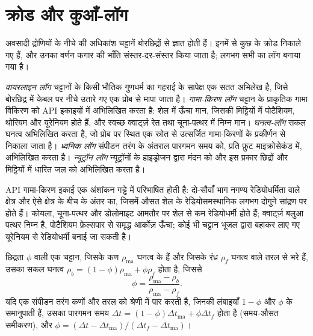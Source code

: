 \section{क्रोड और कुआँ-लॉग}\label{sec:b3:facies-models:logs}

अवसादी द्रोणियों के नीचे की अधिकांश चट्टानें बोरछिद्रों से ज्ञात होती हैं। इनमें से कुछ
के क्रोड निकाले गए हैं, और उनका वर्णन कगार की भाँति संस्तर-दर-संस्तर किया जाता है; लगभग सभी
का लॉग बनाया गया है।

\begin{definition}[वायरलाइन लॉग]\label{def:b3:facies-models:wireline}
\emph{वायरलाइन लॉग} चट्टानों के किसी भौतिक गुणधर्म का गहराई के सापेक्ष एक सतत अभिलेख है,
जिसे बोरछिद्र में केबल पर नीचे उतारे गए एक प्रोब से मापा जाता है।
\emph{गामा-किरण लॉग} चट्टान के प्राकृतिक गामा विकिरण को API इकाइयों में अभिलिखित करता है:
शेल में ऊँचा मान, जिसकी मिट्टियों में पोटैशियम, थोरियम और यूरेनियम होते हैं,
और स्वच्छ क्वार्ट्ज़ रेत तथा चूना-पत्थर में निम्न मान।
\emph{घनत्व-लॉग} सकल घनत्व अभिलिखित करता है, जो प्रोब पर स्थित एक स्रोत से उत्सर्जित
गामा-किरणों के प्रकीर्णन से निकाला जाता है।
\emph{ध्वनिक लॉग} संपीडन तरंग के अंतराल पारगमन समय को,
प्रति फ़ुट माइक्रोसेकंड में, अभिलिखित करता है।
\emph{न्यूट्रॉन लॉग} न्यूट्रॉनों के हाइड्रोजन द्वारा मंदन को
और इस प्रकार छिद्रों और मिट्टियों में धारित जल को अभिलिखित करता है।
\end{definition}

API गामा-किरण इकाई एक अंशांकन गड्ढे में परिभाषित होती है: दो-सौवाँ भाग
नगण्य रेडियोधर्मिता वाले क्षेत्र और ऐसे क्षेत्र के बीच के अंतर का, जिसमें औसत शेल के
रेडियोसमस्थानिक लगभग दोगुने सांद्रण पर होते हैं। कोयला,
चूना-पत्थर और डोलोमाइट आमतौर पर शेल से कम रेडियोधर्मी होते हैं; क्वार्ट्ज़
बलुआ पत्थर निम्न है, पोटैशियम फ़ेल्सपार से समृद्ध आर्कोज़ ऊँचा; कोई भी चट्टान
भूजल द्वारा बहाकर लाए गए यूरेनियम से रेडियोधर्मी बनाई जा सकती है।

\begin{proposition}\label{prop:b3:facies-models:porosity}
छिद्रता $\phi$ वाली एक चट्टान, जिसके कण $\rho_{\mathrm{ma}}$ घनत्व के हैं और
जिसके रंध्र $\rho_f$ घनत्व वाले तरल से भरे हैं, उसका सकल घनत्व
$\rho_b = (1 - \phi)\rho_{\mathrm{ma}} + \phi\rho_f$ होता है, जिससे
\[
\phi = \frac{\rho_{\mathrm{ma}} - \rho_b}{\rho_{\mathrm{ma}} - \rho_f}.
\]
यदि एक संपीडन तरंग कणों और तरल को श्रेणी में पार करती है,
जिनकी लंबाइयाँ $1 - \phi$ और $\phi$ के समानुपाती हैं, उसका पारगमन समय
$\Delta t = (1 - \phi)\Delta t_{\mathrm{ma}} + \phi\Delta t_f$ होता है (समय-औसत
समीकरण), और $\phi = (\Delta t - \Delta
t_{\mathrm{ma}})/(\Delta t_f - \Delta t_{\mathrm{ma}})$।
\end{proposition}

